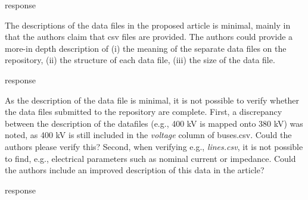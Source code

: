 \documentclass{response}
\begin{document}
\AR response

\RC The descriptions of the data files in the proposed article is minimal, mainly in that the authors claim that csv files are provided. The authors could provide a more-in depth description of (i) the meaning of the separate data files on the repository, (ii) the structure of each data file, (iii) the size of the data file.

\AR response

\RC As the description of the data file is minimal, it is not possible to verify whether the data files submitted to the repository are complete. First, a discrepancy between the description of the datafiles (e.g., 400 kV is mapped onto 380 kV) was noted, as 400 kV is still included in the \textit{voltage} column of buses.csv. Could the authors please verify this? Second, when verifying e.g., \textit{lines.csv}, it is not possible to find, e.g., electrical parameters such as nominal current or impedance. Could the authors include an improved description of this data in the article?

\AR response \cite{test}

\newpage

\end{document}
